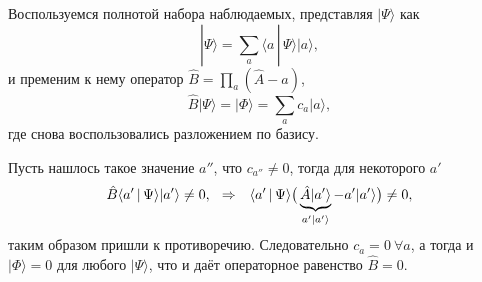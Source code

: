 Воспользуемся полнотой набора наблюдаемых, представляя $| \Psi\rangle $ как
\begin{equation*}
    | \Psi\rangle = \sum_a \langle a \,|\, \Psi \rangle | a\rangle,
\end{equation*}
и пременим к нему оператор $\hat{B} = \prod_a (\hat{A} - a)$, 
\begin{equation*}
    \hat{B} | \Psi\rangle  = | \Phi\rangle = \sum_a c_a | a\rangle,
\end{equation*}
где снова воспользовались разложением по базису. 

Пусть нашлось такое значение $a''$, что $c_{a''} \neq 0$, тогда для некоторого $a'$
\begin{equation*}
    \hat{B} \langle a' \,|\, \Psi \rangle | a'\rangle \neq 0,
    \hspace{0.25cm} \Rightarrow  \hspace{0.25cm}
    \langle a' \,|\, \Psi \rangle \big(
        \underbrace{\hat{A} | a'\rangle}_{a' | a'\rangle }  - a' | a'\rangle 
    \big) \neq 0,
\end{equation*}
таким образом пришли к противоречию. Следовательно $c_a = 0 \ \forall a$, а тогда и $| \Phi\rangle = 0$ для любого $| \Psi\rangle $, что и даёт операторное равенство $\hat{B} = 0$. 